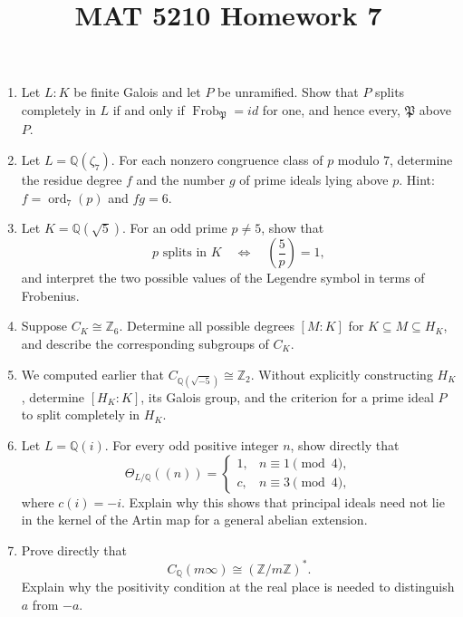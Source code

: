 \documentclass{article}
\title{MAT 5210 Homework 7}
\author{}
\date{}
\begin{document}
\maketitle

\begin{enumerate}
\item Let $L:K$ be finite Galois and let $P$ be unramified. Show that $P$ splits completely
in $L$ if and only if $\operatorname{Frob}_{\mathfrak P}=id$ for one, and hence every,
$\mathfrak P$ above $P$.

\item Let $L=\mathbb Q(\zeta_7)$. For each nonzero congruence class of $p$ modulo $7$,
determine the residue degree $f$ and the number $g$ of prime ideals lying above $p$.
Hint: $f=\operatorname{ord}_7(p)$ and $fg=6$.

\item Let $K=\mathbb Q(\sqrt5)$. For an odd prime $p\neq5$, show that
\[
p\text{ splits in }K
\quad\Longleftrightarrow\quad
\left(\frac5p\right)=1,
\]
and interpret the two possible values of the Legendre symbol in terms of Frobenius.

\item Suppose $C_K\cong\mathbb Z_6$. Determine all possible degrees $[M:K]$ for
$K\subseteq M\subseteq H_K$, and describe the corresponding subgroups of $C_K$.

\item We computed earlier that $C_{\mathbb Q(\sqrt{-5})}\cong\mathbb Z_2$.
Without explicitly constructing $H_K$, determine $[H_K:K]$, its Galois group, and the
criterion for a prime ideal $P$ to split completely in $H_K$.


\item Let $L=\mathbb Q(i)$. For every odd positive integer $n$, show directly that
\[
\Theta_{L/\mathbb Q}((n))=
\begin{cases}
1,&n\equiv1\pmod4,\\
c,&n\equiv3\pmod4,
\end{cases}
\]
where $c(i)=-i$. Explain why this shows that principal ideals need not lie in the kernel of
the Artin map for a general abelian extension.

\item Prove directly that
\[
C_{\mathbb Q}(m\infty)\cong(\mathbb Z/m\mathbb Z)^*.
\]
Explain why the positivity condition at the real place is needed to distinguish $a$ from
$-a$.
\end{enumerate}
\end{document}
